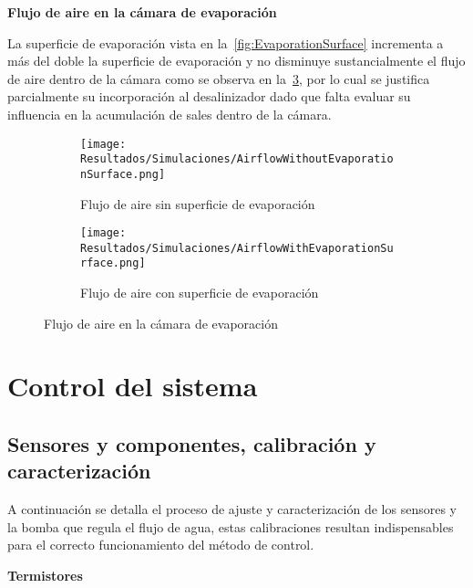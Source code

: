 				
				\textbf{Flujo de aire en la cámara de evaporación}\par
			
				La superficie de evaporación vista en la~\cref{fig:EvaporationSurface} incrementa a más del doble la superficie de evaporación y no disminuye sustancialmente el flujo de aire dentro de la cámara como se observa en la~\cref{fig:AirflowInEvaporationChamber}, por lo cual se justifica parcialmente su incorporación al desalinizador dado que falta evaluar su influencia en la acumulación de sales dentro de la cámara.
				
				\begin{figure}[H]
					\centering
					\begin{subfigure}[t]{0.45\linewidth}
						\centering
						\texttt{[image: Resultados/Simulaciones/AirflowWithoutEvaporationSurface.png]}
						\caption{Flujo de aire sin superficie de evaporación}
						\label{fig:AirflowWithoutEvaporationSurface}
					\end{subfigure}
					\hfill
					\begin{subfigure}[t]{0.45\linewidth}
						\centering
						\texttt{[image: Resultados/Simulaciones/AirflowWithEvaporationSurface.png]}
						\caption{Flujo de aire con superficie de evaporación}
						\label{fig:AirflowWithEvaporationSurface}
					\end{subfigure}
					\caption{Flujo de aire en la cámara de evaporación}
					\label{fig:AirflowInEvaporationChamber}
				\end{figure}
				
	\section{Control del sistema}
	
		\subsection{Sensores y componentes, calibración y caracterización}\label{subsec:calibración}
		
			A continuación se detalla el proceso de ajuste y caracterización de los sensores y la bomba que regula el flujo de agua, estas calibraciones resultan indispensables para el correcto funcionamiento del método de control.
			
			\textbf{Termistores}\par
			
